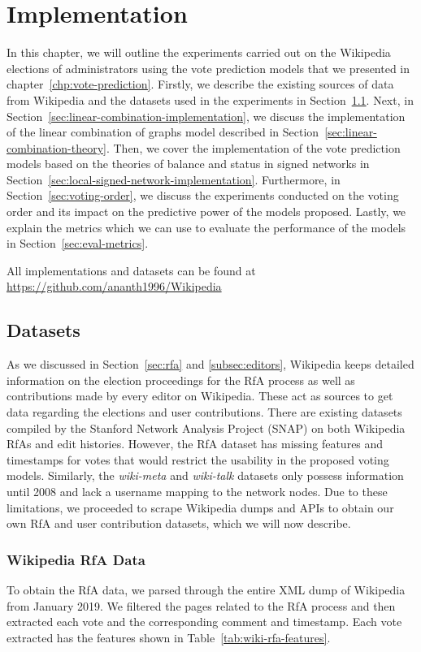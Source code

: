 \chapter{Implementation}
\label{chp:implementation}
In this chapter, we will outline the experiments carried out on the Wikipedia elections of administrators using the vote prediction models that we presented in chapter~\ref{chp:vote-prediction}.
Firstly, we describe the existing sources of data from Wikipedia and the datasets used in the experiments in Section~\ref{sec:datasets}.
Next, in Section~\ref{sec:linear-combination-implementation}, we discuss the implementation of the linear combination of graphs model described in Section~\ref{sec:linear-combination-theory}.
Then, we cover the implementation of the vote prediction models based on the theories of balance and status in signed networks in Section~\ref{sec:local-signed-network-implementation}.
Furthermore, in Section~\ref{sec:voting-order}, we discuss the experiments conducted on the voting order and its impact on the predictive power of the models proposed.
Lastly, we explain the metrics which we can use to evaluate the performance of the models in Section~\ref{sec:eval-metrics}.

All implementations and datasets can be found at \url{https://github.com/ananth1996/Wikipedia}
\section{Datasets}
\label{sec:datasets}
As we discussed in Section~\ref{sec:rfa} and \ref{subsec:editors}, Wikipedia keeps detailed information on the election proceedings for the RfA process as well as contributions made by every editor on Wikipedia.
These act as sources to get data regarding the elections and user contributions. There are existing datasets compiled by the Stanford Network Analysis Project (SNAP) \cite{snapnets} on both Wikipedia RfAs and edit histories.
However, the RfA dataset has missing features and timestamps for votes that would restrict the usability in the proposed voting models.
Similarly, the \textit{wiki-meta} and \textit{wiki-talk} datasets only possess information until 2008 and lack a username mapping to the network nodes.
Due to these limitations, we proceeded to scrape Wikipedia dumps and APIs to obtain our own RfA and user contribution datasets, which we will now describe.

\subsection{Wikipedia RfA Data}
To obtain the RfA data, we parsed through the entire XML dump of Wikipedia from January 2019.
We filtered the pages related to the RfA process and then extracted each vote and the corresponding comment and timestamp.
Each vote extracted has the features shown in Table~\ref{tab:wiki-rfa-features}.

